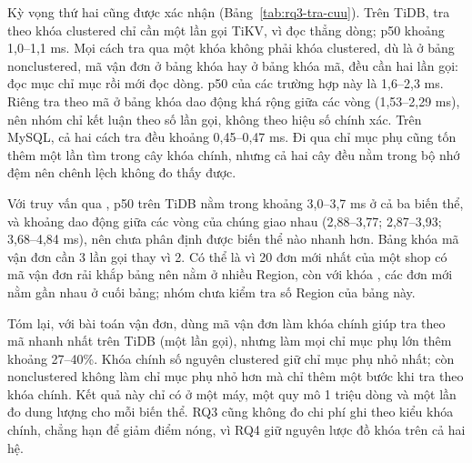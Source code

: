 Kỳ vọng thứ hai cũng được xác nhận (Bảng~\ref{tab:rq3-tra-cuu}). Trên TiDB, tra theo khóa clustered chỉ cần một lần gọi TiKV, vì  đọc thẳng dòng; p50 khoảng 1,0--1,1 ms. Mọi cách tra qua một khóa không phải khóa clustered, dù là  ở bảng nonclustered, mã vận đơn ở bảng khóa  hay  ở bảng khóa mã, đều cần hai lần gọi: đọc mục chỉ mục rồi mới đọc dòng. p50 của các trường hợp này là 1,6--2,3 ms. Riêng tra theo mã ở bảng khóa  dao động khá rộng giữa các vòng (1,53--2,29 ms), nên nhóm chỉ kết luận theo số lần gọi, không theo hiệu số chính xác. Trên MySQL, cả hai cách tra đều khoảng 0,45--0,47 ms. Đi qua chỉ mục phụ cũng tốn thêm một lần tìm trong cây khóa chính, nhưng cả hai cây đều nằm trong bộ nhớ đệm nên chênh lệch không đo thấy được.

Với truy vấn qua , p50 trên TiDB nằm trong khoảng 3,0--3,7 ms ở cả ba biến thể, và khoảng dao động giữa các vòng của chúng giao nhau (2,88--3,77; 2,87--3,93; 3,68--4,84 ms), nên chưa phân định được biến thể nào nhanh hơn. Bảng khóa mã vận đơn cần 3 lần gọi thay vì 2. Có thể là vì 20 đơn mới nhất của một shop có mã vận đơn rải khắp bảng nên nằm ở nhiều Region, còn với khóa , các đơn mới nằm gần nhau ở cuối bảng; nhóm chưa kiểm tra số Region của bảng này.

Tóm lại, với bài toán vận đơn, dùng mã vận đơn làm khóa chính giúp tra theo mã nhanh nhất trên TiDB (một lần gọi), nhưng làm mọi chỉ mục phụ lớn thêm khoảng 27--40\%. Khóa chính số nguyên clustered giữ chỉ mục phụ nhỏ nhất; còn nonclustered không làm chỉ mục phụ nhỏ hơn mà chỉ thêm một bước khi tra theo khóa chính. Kết quả này chỉ có ở một máy, một quy mô 1 triệu dòng và một lần đo dung lượng cho mỗi biến thể. RQ3 cũng không đo chi phí ghi theo kiểu khóa chính, chẳng hạn  để giảm điểm nóng, vì RQ4 giữ nguyên lược đồ khóa  trên cả hai hệ.
